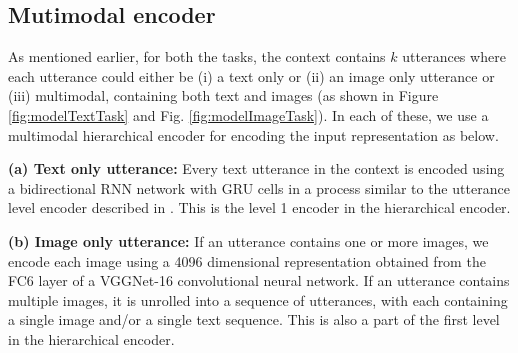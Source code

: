 \documentclass[letterpaper]{article} %
\begin{document}
\subsection{Mutimodal encoder}

\iffalse
\begin{figure*}[!htb]
\centering
{
  \texttt{[image: images/modeltextimage.png]}
   \caption{\label{fig:model} Multimodal Hierarchical Encoder Decoder Architecture for (a) Text Response Task and (b) Image Response Task using the Multimodal Dialog context (elaborated in the leftmost figure). Though the image response task shows a single target positive and negative image, but in general, $m$($>$1) images can be provided as target}
  } 
\end{figure*}
  
\fi 
As mentioned earlier, for both the tasks, the context contains $k$ utterances where each utterance could either be (i) a text only or (ii) an image only utterance or (iii) multimodal, containing both text and images (as shown in Figure \ref{fig:modelTextTask} and Fig. \ref{fig:modelImageTask}). In each of these, we use a multimodal hierarchical encoder for encoding the input representation as below.

\noindent \textbf{(a) Text only utterance:} Every text utterance in the context is encoded using a bidirectional RNN network with GRU \cite{chung2014empirical} cells in a process similar to the utterance level encoder described in \cite{Serban:2016:BED:3016387.3016435}. This is the level 1 encoder in the hierarchical encoder.

\noindent \textbf{(b) Image only utterance:} If an utterance contains one or more images, we encode each image using a 4096 dimensional representation obtained from the FC6 layer of a VGGNet-16 \cite{Simonyan14c} convolutional neural network. If an utterance contains multiple images, it is unrolled into a sequence of utterances, with each containing a single image and/or a single text sequence. This is also a part of the first level in the hierarchical encoder.
\end{document}

